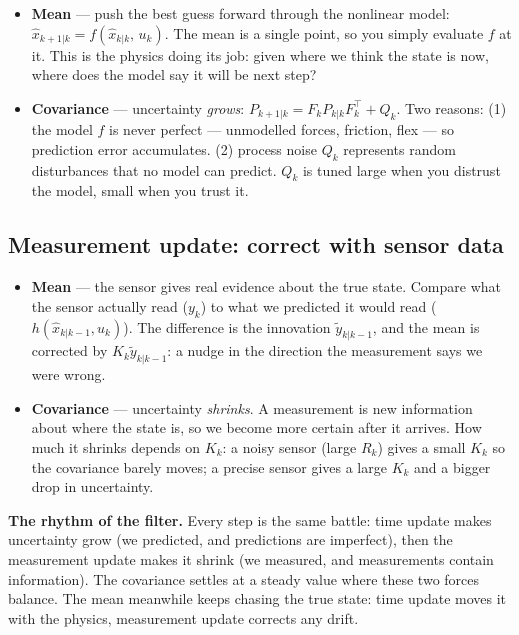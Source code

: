 \documentclass[12pt, a4paper]{article}
\begin{document}
\begin{itemize}[leftmargin=1.4em, topsep=2pt]
  \item \textbf{Mean} --- push the best guess forward through the
        nonlinear model:
        $\hat{x}_{k+1|k} = f(\hat{x}_{k|k},\, u_k)$.
        The mean is a single point, so you simply evaluate $f$ at it.
        This is the physics doing its job: given where we think the
        state is now, where does the model say it will be next step?
  \item \textbf{Covariance} --- uncertainty \emph{grows}:
        $P_{k+1|k} = F_k P_{k|k} F_k^\top + Q_k$.
        Two reasons: (1) the model $f$ is never perfect --- unmodelled
        forces, friction, flex --- so prediction error accumulates.
        (2) process noise $Q_k$ represents random disturbances that no
        model can predict.
        $Q_k$ is tuned large when you distrust the model, small when
        you trust it.
\end{itemize}

\subsection*{Measurement update: correct with sensor data}

\begin{itemize}[leftmargin=1.4em, topsep=2pt]
  \item \textbf{Mean} --- the sensor gives real evidence about the
        true state. Compare what the sensor actually read ($y_k$) to
        what we predicted it would read ($h(\hat{x}_{k|k-1},u_k)$).
        The difference is the innovation $\tilde{y}_{k|k-1}$, and the
        mean is corrected by $K_k \tilde{y}_{k|k-1}$: a nudge in the
        direction the measurement says we were wrong.
  \item \textbf{Covariance} --- uncertainty \emph{shrinks}.
        A measurement is new information about where the state is, so
        we become more certain after it arrives.
        How much it shrinks depends on $K_k$: a noisy sensor
        (large $R_k$) gives a small $K_k$ so the covariance barely
        moves; a precise sensor gives a large $K_k$ and a bigger drop
        in uncertainty.
\end{itemize}

\begin{notebox}
  \textbf{The rhythm of the filter.}
  Every step is the same battle: time update makes uncertainty grow
  (we predicted, and predictions are imperfect), then the measurement
  update makes it shrink (we measured, and measurements contain
  information). The covariance settles at a steady value where these
  two forces balance. The mean meanwhile keeps chasing the true state:
  time update moves it with the physics, measurement update corrects
  any drift.
\end{notebox}
\end{document}
